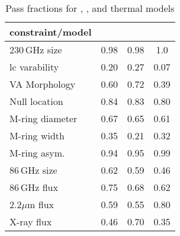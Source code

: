 \begin{table*}
\caption{Pass fractions for \kharma, \bhac, and \hamr thermal models}
\centering
\begin{tabular}{l|ccc}
\hline
constraint/model	& \kharma	&	\bhac	&	\hamr \\
\hline
230\,GHz size	&	0.98	&	0.98   &	1.0		\\
lc varability	&	0.20	&	0.27   &	0.07	\\
VA Morphology	&	0.60	&	0.72   &	0.39	\\
Null location	&	0.84	&	0.83   &	0.80	\\
M-ring diameter	&	0.67	&	0.65   &	0.61	\\
M-ring width	&	0.35	&	0.21   &	0.32	\\
M-ring asym.	&	0.94	&	0.95   &	0.99	\\
86\,GHz size	&	0.62	&	0.59   &	0.46	\\
86\,GHz flux	&	0.75	&	0.68   &	0.62	\\
2.2$\mu$m flux	&	0.59	&	0.55   &	0.80	\\
X-ray flux		&	0.46	&	0.70   &	0.35	\\
\hline
\end{tabular}
\label{tab:passfraction_thermal}
\end{table*} 


